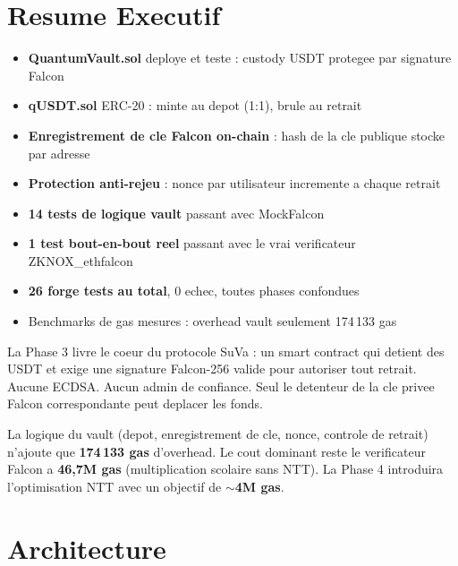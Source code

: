 \documentclass[11pt,a4paper]{article}
\begin{document}
\section{Resume Executif}

\begin{resultbox}
\begin{itemize}
  \item[$\checkmark$] \textbf{QuantumVault.sol} deploye et teste : custody USDT protegee par signature Falcon
  \item[$\checkmark$] \textbf{qUSDT.sol} ERC-20 : minte au depot (1:1), brule au retrait
  \item[$\checkmark$] \textbf{Enregistrement de cle Falcon on-chain} : hash de la cle publique stocke par adresse
  \item[$\checkmark$] \textbf{Protection anti-rejeu} : nonce par utilisateur incremente a chaque retrait
  \item[$\checkmark$] \textbf{14 tests de logique vault} passant avec MockFalcon
  \item[$\checkmark$] \textbf{1 test bout-en-bout reel} passant avec le vrai verificateur ZKNOX\_ethfalcon
  \item[$\checkmark$] \textbf{26 forge tests au total}, 0 echec, toutes phases confondues
  \item[$\checkmark$] Benchmarks de gas mesures : overhead vault seulement 174\,133 gas
\end{itemize}
\end{resultbox}

\vspace{0.5cm}

La Phase 3 livre le coeur du protocole SuVa : un smart contract qui detient des USDT et exige
une signature Falcon-256 valide pour autoriser tout retrait. Aucune ECDSA. Aucun admin de
confiance. Seul le detenteur de la cle privee Falcon correspondante peut deplacer les fonds.

La logique du vault (depot, enregistrement de cle, nonce, controle de retrait) n'ajoute que
\textbf{174\,133 gas} d'overhead. Le cout dominant reste le verificateur Falcon a \textbf{46,7M gas}
(multiplication scolaire sans NTT). La Phase 4 introduira l'optimisation NTT avec un objectif
de \textbf{$\sim$4M gas}.

\section{Architecture}
\end{document}
